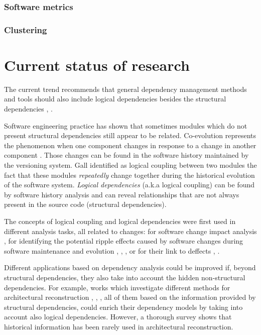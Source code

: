 \documentclass[12pt]{mitthesis}
\begin{document}
\subsection{Software metrics}
\subsection{Clustering}


\chapter{Current status of research}

The current trend recommends that general dependency management methods and tools should also include logical dependencies besides the structural dependencies \cite{Oliva:2011:ISL:2067853.2068086}, \cite{DBLP:journals/jss/AjienkaC17}. 

Software engineering practice has shown that sometimes modules which do not present structural dependencies still appear to be related. Co-evolution represents the phenomenon when one component changes in response to a change in another component \cite{Yu:2007:UCC:1231330.1231370}. Those changes can be found in the software history maintained by the versioning system. Gall \cite{Gall:1998:DLC:850947.853338} identified as logical coupling between two modules the fact that these modules  \textit{repeatedly} change together during the historical evolution of the software system. 
 \textit{Logical dependencies} (a.k.a logical coupling) can be found by software history analysis and can reveal relationships that are not always present in the source code (structural dependencies).  

The concepts of logical coupling and logical dependencies were first used in different analysis tasks, all related to changes: for software change impact analysis \cite{1553643}, for identifying the potential ripple effects caused by software changes during software maintenance and evolution \cite{DBLP:conf/issre/OlivaG15}, \cite{Oliva:2011:ISL:2067853.2068086}, \cite{Poshyvanyk2009}, \cite{posh2010} or for their link to deffects \cite{wiese}, \cite{Zimmermann:2004:MVH:998675.999460}.

Different applications based on dependency analysis could be improved if, beyond structural dependencies, they also take into account the hidden non-structural dependencies. For example, works  which investigate different methods for architectural reconstruction \cite{SoraConti}, \cite{SoraSem13}, \cite{PagerankENASE},  all of them based on the information provided by structural dependencies, could enrich their dependency models by taking into account also logical dependencies. However, a thorough survey \cite{sar} shows that historical information has been rarely used in architectural reconstruction. 
\end{document}
